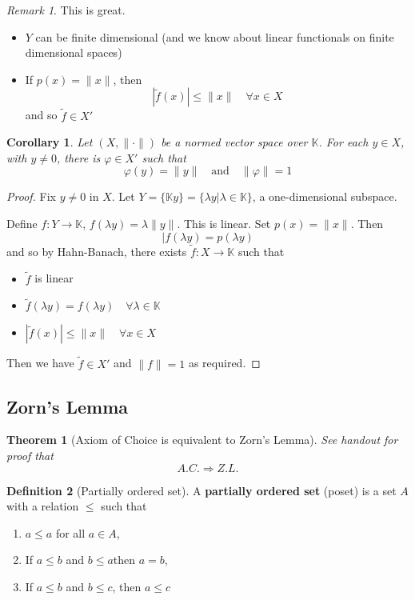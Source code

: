 \documentclass[10pt, reqno, oneside]{amsart}
\theoremstyle{plain}%
\newtheorem{thm}{Theorem}[section]
\newtheorem*{cor}{Corollary}
\theoremstyle{definition}
\newtheorem{defn}[thm]{Definition}
\theoremstyle{remark}
\newtheorem*{rem}{Remark}
\newcommand{\K}{\mathbb{K}}
\renewcommand{\phi}{\varphi}
\begin{document}
\begin{rem}
	This is great.
	\begin{itemize}
		\item $Y$ can be finite dimensional (and we know about linear functionals on finite dimensional spaces)
		\item If $p(x) = \| x \|$, then \[
			|\tilde f (x) | \leq \|x \| \quad \forall x \in X
		\] and so $\tilde f \in X'$
	\end{itemize}
\end{rem}

\begin{cor}
	Let $(X, \| \cdot \|)$ be a normed vector space over $\K$.  For each $y \in X$, with $y \neq 0$, there is $\phi \in X'$ such that \[
		\phi(y) = \| y \| \quad \text{and} \quad \| \phi \| = 1
	\]
\end{cor}
\begin{proof}
	Fix $y \neq 0$ in $X$.  Let $Y = \{ \K y \} = \{ \lambda y | \lambda \in \K \}$, a one-dimensional subspace.  
	
	Define $f : Y \rightarrow \K$, $f( \lambda y) = \lambda \| y \|$.  This is linear.  Set $p(x) = \| x \|$.  Then \[
		| f(\lambda y ) = p(\lambda y)
	\] and so by Hahn-Banach, there exists $\tilde f : X \rightarrow \K$ such that
	\begin{itemize}
		\item $\tilde f$ is linear
		\item $\tilde f(\lambda y) = f( \lambda y) \quad \forall \lambda \in \K$
		\item $| \tilde f (x) | \leq \| x \| \quad \forall x \in X$
	\end{itemize}
	Then we  have $\tilde f \in X'$ and $\| f \| = 1$ as required.
\end{proof}


\subsection{Zorn's Lemma} %
\label{sub:zorn_s_lemma}

\begin{thm}[Axiom of Choice is equivalent to Zorn's Lemma]
	See handout for proof that \[
		A.C. \Rightarrow Z.L.
	\]
\end{thm}

\begin{defn}[Partially ordered set]
	A \textbf{partially ordered set} (poset) is a set $A$ with a relation $\leq$ such that 
	\begin{enumerate}[(1)]
		\item $ a \leq a$ for all $a \in A$,
		\item If $a \leq b$ and $b \leq a$then $a = b$,
		\item If $a \leq b$ and $b \leq c$, then $a \leq c$
	\end{enumerate}
\end{defn}
\end{document}
